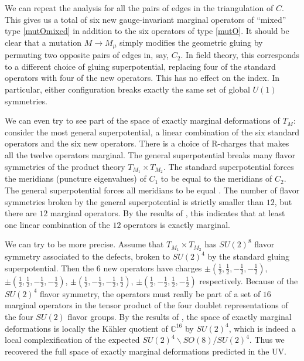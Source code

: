 \documentclass[11pt,letterpaper]{article}
\numberwithin{equation}{section}
\begin{document}
We can repeat the analysis for all the pairs of edges in the triangulation of $C$. This gives us a total of six new
gauge-invariant marginal operators of ``mixed'' type \eqref{mutOmixed} in addition to the six operators of type \eqref{mutO}. It should be clear that a mutation $M \to M_\mu$ simply modifies the geometric gluing by permuting two opposite pairs of edges in, say, $C_2$. In field theory, this corresponds to a different choice of
gluing superpotential, replacing four of the standard operators with four of the new operators.
This has no effect on the index. In particular, either configuration breaks exactly the same set of global $U(1)$ symmetries.

We can even try to see part of the space of exactly marginal deformations of $T_M$:
consider the most general superpotential, a linear combination of the six standard operators and the six new operators.
There is a choice of R-charges that makes all the twelve operators marginal. The general superpotential breaks
many flavor symmetries of the product theory $T_{M_1} \times T_{M_2}$. The standard superpotential forces the
meridians (puncture eigenvalues) of $C_1$ to be equal to the meridians of $C_2$. The general superpotential forces all meridians to be equal .
The number of flavor symmetries broken by the general superpotential is strictly smaller than $12$, but there are $12$ marginal operators.
By the results of \cite{GKSTW}, this indicates that at least one linear combination of the $12$ operators is exactly marginal.

We can try to be more precise. Assume that $T_{M_1} \times T_{M_2}$ has $SU(2)^8$ flavor symmetry associated to the defects, broken to $SU(2)^4$ by the standard gluing superpotential.
Then the $6$ new operators have charges
$\pm (\frac12,\frac12,-\frac12,-\frac12)$, $\pm (\frac12,\frac12,-\frac12,-\frac12)$, $\pm (\frac12,-\frac12,-\frac12,\frac12)$, $\pm (\frac12,-\frac12,\frac12,-\frac12)$ respectively.
Because of the $SU(2)^4$ flavor symmetry, the operators must really be part of a set of $16$ marginal operators in the tensor product of
the four doublet representations of the four $SU(2)$ flavor groups. By the results of \cite{GKSTW}, the space of exactly marginal deformations
is locally the K\"ahler quotient of ${\mathbb C}^{16}$ by $SU(2)^4$, which is indeed a local complexification of the expected
$SU(2)^4 \backslash SO(8)/SU(2)^4$. Thus we recovered the full space of exactly marginal deformations predicted in the UV.
\end{document}

